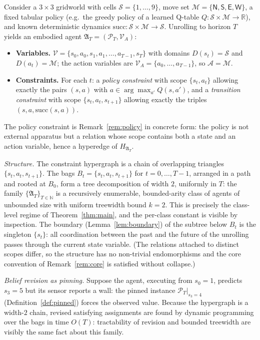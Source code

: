 \documentclass[runningheads]{llncs}
\begin{document}
\begin{example}\label{ex:gridworld}
Consider a $3 \times 3$ gridworld with cells $\mathcal{S} = \{1,\ldots,9\}$, move set $\mathcal{M} = \{\mathsf{N},\mathsf{S},\mathsf{E},\mathsf{W}\}$, a fixed tabular policy (e.g.\ the greedy policy of a learned Q-table $Q\colon \mathcal{S} \times \mathcal{M} \to \mathbb{R}$), and known deterministic dynamics $\mathrm{succ}\colon \mathcal{S} \times \mathcal{M} \to \mathcal{S}$. Unrolling to horizon $T$ yields an embodied agent $\mathfrak{A}_T = (\mathcal{P}_T, \mathcal{V}_A)$:
\begin{itemize}[nosep]
  \item \textbf{Variables.} $\mathcal{V} = \{s_0, a_0, s_1, a_1, \ldots, a_{T-1}, s_T\}$ with domains $D(s_t) = \mathcal{S}$ and $D(a_t) = \mathcal{M}$; the action variables are $\mathcal{V}_A = \{a_0, \ldots, a_{T-1}\}$, so $\mathcal{A} = \mathcal{M}$.
  \item \textbf{Constraints.} For each $t$: a \emph{policy constraint} with scope $\{s_t, a_t\}$ allowing exactly the pairs $(s, a)$ with $a \in \arg\max_{a'} Q(s, a')$, and a \emph{transition constraint} with scope $\{s_t, a_t, s_{t+1}\}$ allowing exactly the triples $(s, a, \mathrm{succ}(s,a))$.
\end{itemize}
The policy constraint is Remark~\ref{rem:policy} in concrete form: the policy is not external apparatus but a relation whose scope contains both a state and an action variable, hence a hyperedge of $H_{\mathfrak{A}_T}$.

\emph{Structure.} The constraint hypergraph is a chain of overlapping triangles $\{s_t, a_t, s_{t+1}\}$. The bags $B_t = \{s_t, a_t, s_{t+1}\}$ for $t = 0, \ldots, T-1$, arranged in a path and rooted at $B_0$, form a tree decomposition of width $2$, uniformly in $T$: the family $\{\mathfrak{A}_T\}_{T \in \mathbb{N}}$ is a recursively enumerable, bounded-arity class of agents of unbounded size with uniform treewidth bound $k = 2$. This is precisely the class-level regime of Theorem~\ref{thm:main}, and the per-class constant is visible by inspection. The boundary (Lemma~\ref{lem:boundary}) of the subtree below $B_t$ is the singleton $\{s_t\}$: all coordination between the past and the future of the unrolling passes through the current state variable. (The relations attached to distinct scopes differ, so the structure has no non-trivial endomorphisms and the core convention of Remark~\ref{rem:core} is satisfied without collapse.)

\emph{Belief revision as pinning.} Suppose the agent, executing from $s_0 = 1$, predicts $s_3 = 5$ but its sensor reports a wall: the pinned instance $\mathcal{P}_T|_{s_3 = 4}$ (Definition~\ref{def:pinned}) forces the observed value. Because the hypergraph is a width-$2$ chain, revised satisfying assignments are found by dynamic programming over the bags in time $O(T)$: tractability of revision and bounded treewidth are visibly the same fact about this family.


\end{example}
\end{document}
